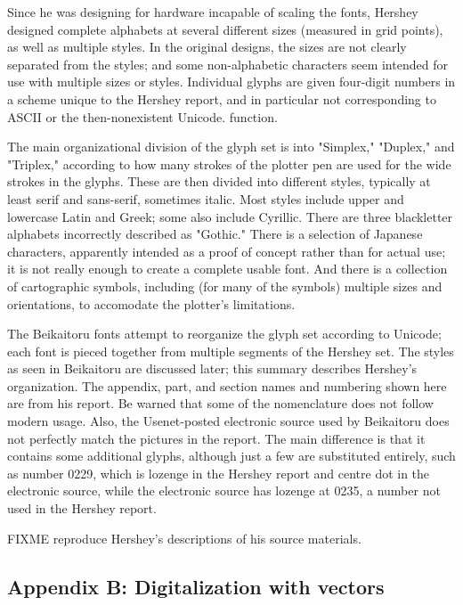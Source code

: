 \documentclass{article}
\begin{document}
Since he was designing for hardware incapable of scaling the fonts, Hershey
designed complete alphabets at several different sizes (measured in grid
points), as well as multiple styles.  In the original designs, the sizes are
not clearly separated from the styles; and some non-alphabetic characters
seem intended for use with multiple sizes or styles.  Individual glyphs are
given four-digit numbers in a scheme unique to the Hershey report, and in
particular not corresponding to ASCII or the then-nonexistent Unicode.
function.

The main organizational division of the glyph set is into "Simplex,"
"Duplex," and "Triplex," according to how many strokes of the plotter
pen are used for the wide strokes in the glyphs.  These are then divided
into different styles, typically at least serif and sans-serif, sometimes
italic.  Most styles include upper and lowercase Latin and Greek; some also
include Cyrillic.  There are three blackletter alphabets incorrectly
described as "Gothic." There is a selection of Japanese
characters, apparently intended as a proof of concept rather than for actual
use; it is not really enough to create a complete usable font.  And there is
a collection of cartographic symbols, including (for many of the symbols)
multiple sizes and orientations, to accomodate the plotter's limitations.

The Beikaitoru fonts attempt to reorganize the glyph set according to
Unicode; each font is pieced together from multiple segments of the Hershey
set.  The styles as seen in Beikaitoru are discussed later; this summary
describes Hershey's organization.  The appendix, part, and section names and
numbering shown here are from his report.  Be warned that some of the
nomenclature does not follow modern usage.  Also, the Usenet-posted
electronic source used by Beikaitoru does not perfectly match the pictures
in the report.  The main difference is that it contains some additional
glyphs, although just a few are substituted entirely, such as number 0229,
which is lozenge in the Hershey report and centre dot in the electronic
source, while the electronic source has lozenge at 0235, a number not used
in the Hershey report.

FIXME reproduce Hershey's descriptions of his source materials.

\subsection*{Appendix B: Digitalization with vectors}
\end{document}
